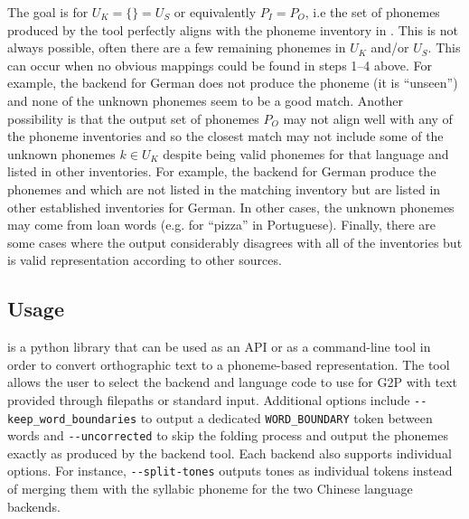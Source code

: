 The goal is for $U_K = \{\} = U_S$ or equivalently $P_I = P_O$, i.e the set of phonemes produced by the tool perfectly aligns with the phoneme inventory in \phoible. This is not always possible, often there are a few remaining phonemes in $U_K$ and/or $U_S$. This can occur when no obvious mappings could be found in steps 1--4 above. For example, the \epitran backend for German does not produce the phoneme  (it is ``unseen'') and none of the unknown phonemes seem to be a good match. Another possibility is that the output set of phonemes $P_O$ may not align well with any of the \phoible phoneme inventories and so the closest match may not include some of the unknown phonemes $k \in U_K$ despite being valid phonemes for that language and listed in other inventories. For example, the \epitran backend for German produce the phonemes  and  which are not listed in the matching inventory but are listed in other established inventories for German. In other cases, the unknown phonemes may come from loan words (e.g.  for ``pizza'' in Portuguese). Finally, there are some cases where the output considerably disagrees with all of the \phoible inventories but is valid representation according to other sources.

\subsection{Usage}\label{sec:13-usage}

\gpp is a python library that can be used as an API or as a command-line tool in order to convert orthographic text to a phoneme-based representation. The tool allows the user to select the backend and language code to use for G2P with text provided through filepaths or standard input. Additional options include \verb|--keep_word_boundaries| to output a dedicated \texttt{WORD\_BOUNDARY} token between words and \verb|--uncorrected| to skip the folding process and output the phonemes exactly as produced by the backend tool. Each backend also supports individual options. For instance, \verb|--split-tones| outputs tones as individual tokens instead of merging them with the syllabic phoneme for the two Chinese language backends. 





